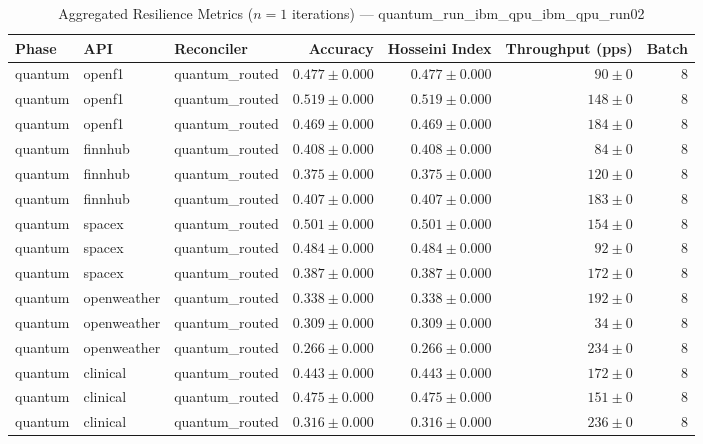 
\begin{table}[htbp]
\caption{Aggregated Resilience Metrics ($n=1$ iterations) --- quantum_run_ibm_qpu_ibm_qpu_run02}
\begin{tabular}{l l l r r r r}
\hline
Phase & API & Reconciler & Accuracy & Hosseini Index & Throughput (pps) & Batch \\
\hline
quantum & openf1 & quantum\_routed & $0.477\pm0.000$ & $0.477\pm0.000$ & $90\pm0$ & 8 \\
quantum & openf1 & quantum\_routed & $0.519\pm0.000$ & $0.519\pm0.000$ & $148\pm0$ & 8 \\
quantum & openf1 & quantum\_routed & $0.469\pm0.000$ & $0.469\pm0.000$ & $184\pm0$ & 8 \\
quantum & finnhub & quantum\_routed & $0.408\pm0.000$ & $0.408\pm0.000$ & $84\pm0$ & 8 \\
quantum & finnhub & quantum\_routed & $0.375\pm0.000$ & $0.375\pm0.000$ & $120\pm0$ & 8 \\
quantum & finnhub & quantum\_routed & $0.407\pm0.000$ & $0.407\pm0.000$ & $183\pm0$ & 8 \\
quantum & spacex & quantum\_routed & $0.501\pm0.000$ & $0.501\pm0.000$ & $154\pm0$ & 8 \\
quantum & spacex & quantum\_routed & $0.484\pm0.000$ & $0.484\pm0.000$ & $92\pm0$ & 8 \\
quantum & spacex & quantum\_routed & $0.387\pm0.000$ & $0.387\pm0.000$ & $172\pm0$ & 8 \\
quantum & openweather & quantum\_routed & $0.338\pm0.000$ & $0.338\pm0.000$ & $192\pm0$ & 8 \\
quantum & openweather & quantum\_routed & $0.309\pm0.000$ & $0.309\pm0.000$ & $34\pm0$ & 8 \\
quantum & openweather & quantum\_routed & $0.266\pm0.000$ & $0.266\pm0.000$ & $234\pm0$ & 8 \\
quantum & clinical & quantum\_routed & $0.443\pm0.000$ & $0.443\pm0.000$ & $172\pm0$ & 8 \\
quantum & clinical & quantum\_routed & $0.475\pm0.000$ & $0.475\pm0.000$ & $151\pm0$ & 8 \\
quantum & clinical & quantum\_routed & $0.316\pm0.000$ & $0.316\pm0.000$ & $236\pm0$ & 8 \\

\end{tabular}
\end{table}
